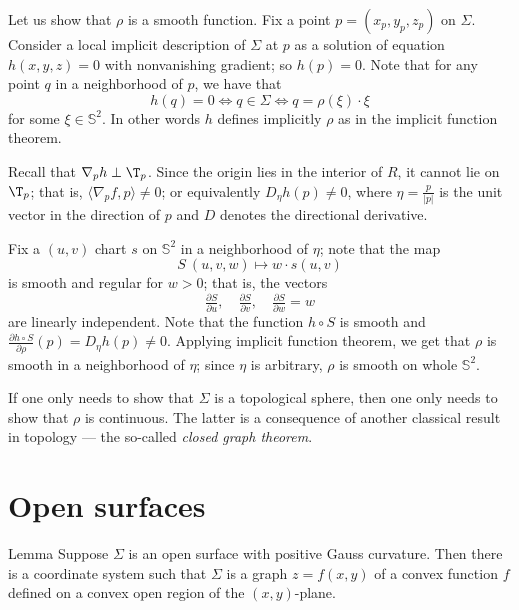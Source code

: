Let us show that $\rho$ is a smooth function.
Fix a point $p=(x_p,y_p,z_p)$ on $\Sigma$.
Consider a local implicit description of $\Sigma$ at $p$ as a solution of equation $h(x,y,z)=0$ with nonvanishing gradient;
so $h(p)=0$.
Note that for any point $q$ in a neighborhood of $p$, we have that 
\[h(q)=0 \iff q\in \Sigma \iff q=\rho(\xi)\cdot\xi\] for some $\xi\in \mathbb{S}^2$.
In other words $h$ defines implicitly $\rho$ as in the implicit function theorem.



Recall that $\nabla_p h\perp \T_p$.
Since the origin lies in the interior of $R$, it cannot lie on $\T_p$;
that is, $\langle\nabla_p f,p \rangle\ne0$;
or equivalently $D_\eta h(p)\ne 0$, where $\eta=\tfrac{p}{|p|}$ is the unit vector in the direction of $p$ and $D$ denotes the directional derivative.

Fix a $(u,v)$ chart $s$ on $\mathbb{S}^2$ in a neighborhood of $\eta$;
note that the map 
\[S\:(u,v,w)\mapsto w\cdot s(u,v)\] 
is smooth and regular for $w>0$; that is, the vectors 
\[\tfrac{\partial S}{\partial u},\quad \tfrac{\partial S}{\partial v},\quad  \tfrac{\partial S}{\partial w}=w\] are linearly independent.
Note that the function $h\circ S$ is smooth and
$\tfrac{\partial h\circ S}{\partial \rho}(p)=D_\eta h(p)\ne 0$.
Applying implicit function theorem, we get that $\rho$ is smooth in a neighborhood of $\eta$;
since $\eta$ is arbitrary, $\rho$ is smooth on whole $\mathbb{S}^2$.
\qeds


If one only needs to show that $\Sigma$ is a topological sphere, then one only needs to show that $\rho$ is continuous.
The latter is a consequence of another classical result in topology --- the so-called \emph{closed graph theorem}.





\section*{Open surfaces}

\begin{thm}{Lemma}\label{lem:graph}
Suppose $\Sigma$ is an open surface with positive Gauss curvature.
Then there is a coordinate system such that 
$\Sigma$ is a graph $z=f(x,y)$ of a convex function $f$ defined on a convex open region of the $(x,y)$-plane.
\end{thm}

\qeds

 





